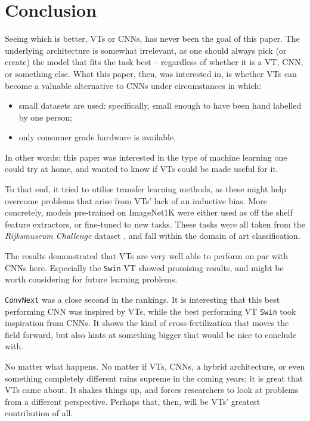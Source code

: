 \section{Conclusion}
Seeing which is better, VTs or CNNs, has never been the goal of this paper. The underlying architecture is somewhat irrelevant, as one should always pick (or create) the model that fits the task best -- regardless of whether it is a VT, CNN, or something else. What this paper, then, was interested in, is whether VTs can become a valuable alternative to CNNs under circumstances in which:
\begin{itemize}
\item small datasets are used: specifically, small enough to have been hand labelled by one person;
\item only consumer grade hardware is available.
\end{itemize}
In other words: this paper was interested in the type of machine learning one could try at home, and wanted to know if VTs could be made useful for it.

To that end, it tried to utilise transfer learning methods, as these might help overcome problems that arise from VTs' lack of an inductive bias. More concretely, models pre-trained on ImageNet1K were either used as off the shelf feature extractors, or fine-tuned to new tasks. These tasks were all taken from the \textit{Rijksmuseum Challenge} dataset \citep{mensink14icmr}, and fall within the domain of art classification.

The results demonstrated that VTs are very well able to perform on par with CNNs here. Especially the \texttt{Swin} VT showed promising results, and might be worth considering for future learning problems.

\texttt{ConvNext} was a close second in the rankings. It is interesting that this best performing CNN was inspired by VTs, while the best performing VT \texttt{Swin} took inspiration from CNNs. It shows the kind of cross-fertilization that moves the field forward, but also hints at something bigger that would be nice to conclude with.

No matter what happens. No matter if VTs, CNNs, a hybrid architecture, or even something completely different rains supreme in the coming years; it is great that VTs came about. It shakes things up, and forces researchers to look at problems from a different perspective. Perhaps that, then, will be VTs' greatest contribution of all.
